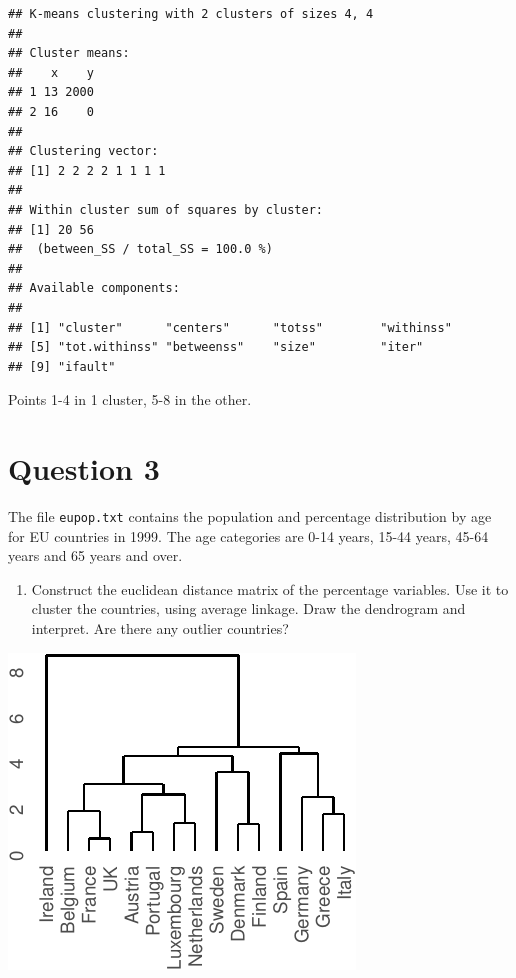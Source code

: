 \documentclass[]{article}
\newenvironment{Shaded}{\begin{snugshade}}{\end{snugshade}}
\newcommand{\DecValTok}[1]{\textcolor[rgb]{0.00,0.00,0.81}{#1}}
\newcommand{\KeywordTok}[1]{\textcolor[rgb]{0.13,0.29,0.53}{\textbf{#1}}}
\newcommand{\NormalTok}[1]{#1}
\newcommand{\OperatorTok}[1]{\textcolor[rgb]{0.81,0.36,0.00}{\textbf{#1}}}
\newcommand{\StringTok}[1]{\textcolor[rgb]{0.31,0.60,0.02}{#1}}
\providecommand{\tightlist}{%
  \setlength{\itemsep}{0pt}\setlength{\parskip}{0pt}}
\begin{document}
\begin{verbatim}
## K-means clustering with 2 clusters of sizes 4, 4
## 
## Cluster means:
##    x    y
## 1 13 2000
## 2 16    0
## 
## Clustering vector:
## [1] 2 2 2 2 1 1 1 1
## 
## Within cluster sum of squares by cluster:
## [1] 20 56
##  (between_SS / total_SS = 100.0 %)
## 
## Available components:
## 
## [1] "cluster"      "centers"      "totss"        "withinss"    
## [5] "tot.withinss" "betweenss"    "size"         "iter"        
## [9] "ifault"
\end{verbatim}

Points 1-4 in 1 cluster, 5-8 in the other.

\hypertarget{question-3}{%
\section{Question 3}\label{question-3}}

The file \texttt{eupop.txt} contains the population and percentage
distribution by age for EU countries in 1999. The age categories are
0-14 years, 15-44 years, 45-64 years and 65 years and over.

\begin{enumerate}
\def\labelenumi{\alph{enumi})}
\tightlist
\item
  Construct the euclidean distance matrix of the percentage variables.
  Use it to cluster the countries, using average linkage. Draw the
  dendrogram and interpret. Are there any outlier countries?
\end{enumerate}

\begin{Shaded}
\end{Shaded}

\begin{center}\includegraphics{sol_A1_files/figure-latex/unnamed-chunk-6-1} \end{center}
\end{document}
